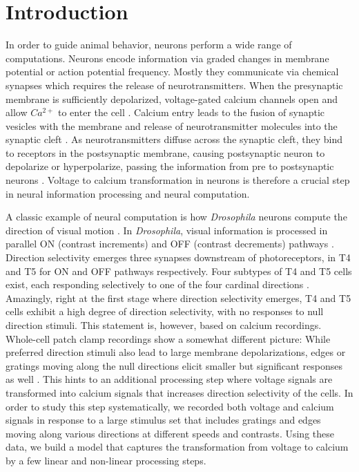 \documentclass[9pt,lineno]{elife}
\begin{document}
\section{Introduction}
In order to guide animal behavior, neurons perform a wide range of computations. Neurons encode information via graded changes in membrane potential or action potential frequency. Mostly they communicate via chemical synapses which requires the release of neurotransmitters. When the presynaptic membrane is sufficiently depolarized, voltage-gated calcium channels open and allow $Ca^{2+}$ to enter the cell \parencite{Luo2020}. Calcium entry leads to the fusion of synaptic vesicles with the membrane and release of neurotransmitter molecules into the synaptic cleft \parencite{Chapman2002}.  As neurotransmitters diffuse across the synaptic cleft, they bind to receptors in the postsynaptic membrane, causing postsynaptic neuron to depolarize or hyperpolarize, passing the information from pre to postsynaptic neurons \parencite{Maio2008}. Voltage to calcium transformation in neurons is therefore a crucial step in neural information processing and neural computation. 

A classic example of neural computation is how \textit{Drosophila} neurons compute the direction of visual motion \parencite{Borst2020}. In \textit{Drosophila}, visual information is processed in parallel ON (contrast increments) and OFF (contrast decrements) pathways \parencite{Joesch2010, Eichner2011}. Direction selectivity emerges three synapses downstream of photoreceptors, in T4 and T5 for ON and OFF pathways respectively. Four subtypes of T4 and T5 cells exist, each responding selectively to one of the four cardinal directions \parencite{Maisak2013}. Amazingly, right at the first stage where direction selectivity emerges, T4 and T5 cells exhibit a high degree of direction selectivity, with no responses to null direction stimuli. This statement is, however, based on calcium recordings. Whole-cell patch clamp recordings show a somewhat different picture: While preferred direction stimuli also lead to large membrane depolarizations, edges or gratings moving along the null directions elicit smaller but significant responses as well \parencite{Groschner2022, Wienecke2018}. This hints to an additional processing step where voltage signals are transformed into calcium signals that increases direction selectivity of the cells. In order to study this step systematically, we recorded both voltage and calcium signals in response to a large stimulus set that includes gratings and edges moving along various directions at different speeds and contrasts. Using these data, we build a model that captures the transformation from voltage to calcium by a few linear and non-linear processing steps.
\end{document}

